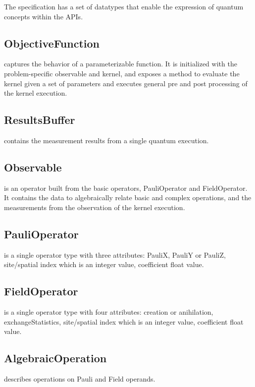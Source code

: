 The \qcor specification has a set of datatypes that enable the expression of quantum concepts within the \qcor \ac{API}s.\\

\subsection{\textbf{ObjectiveFunction}}\label{subsec:ObjectiveFunction}
 captures the behavior of a parameterizable function. It is initialized with the problem-specific observable and kernel, and exposes a method to evaluate the kernel given a set of parameters and executes general pre and post processing of the kernel execution.\\

\subsection{\textbf{ResultsBuffer}}\label{subsec:ResultsBuffer}
 contains the measurement results from a single quantum execution.\\

\subsection{\textbf{Observable}}\label{subsec:Observable}
 is an operator built from the basic operators, PauliOperator and FieldOperator. It contains the data to algebraically relate basic and complex operations, and the measurements from the observation of the kernel execution.\\

\subsection{\textbf{PauliOperator}}\label{subsec:PauliOperator}
 is a single operator type with three attributes: PauliX, PauliY or PauliZ, site/spatial index which is an integer value, coefficient float value.\\

\subsection{\textbf{FieldOperator}}\label{subsec:FieldOperator}
 is a single operator type with four attributes: creation or anihilation, exchangeStatistics, site/spatial index which is an integer value, coefficient float value.\\

\subsection{\textbf{AlgebraicOperation}}\label{subsec:AlgebraicOperation}
  describes operations on Pauli and Field operands.\\


